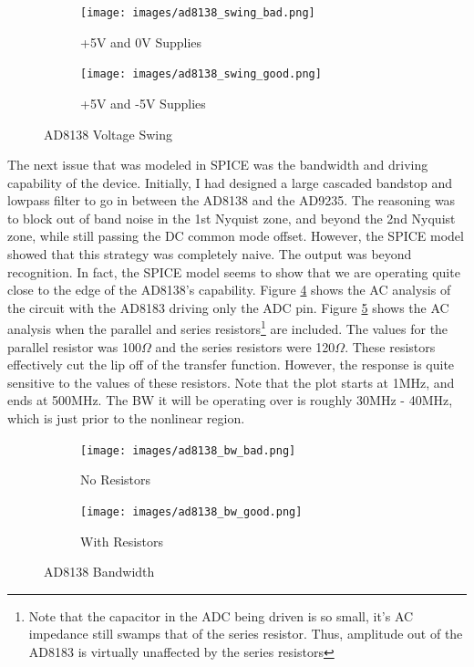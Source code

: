 \documentclass[a4paper, 12pt, notitlepage]{article}
\begin{document}
\begin{figure}[ht]
\centering
\begin{subfigure}[b]{0.45\textwidth}
  \texttt{[image: images/ad8138\_swing\_bad.png]}
  \caption{+5V and 0V Supplies}
  \label{fig:ad8138_swing_bad}
\end{subfigure}
\begin{subfigure}[b]{0.45\textwidth}  
  \texttt{[image: images/ad8138\_swing\_good.png]}
  \caption{+5V and -5V Supplies}
  \label{fig:ad8138_swing_good}
\end{subfigure}

\caption{AD8138 Voltage Swing}
\label{fig:ad8138_swing}
\end{figure}

The next issue that was modeled in SPICE was the bandwidth and driving capability of the device.  Initially, I had designed a large cascaded bandstop and lowpass filter to go in between the AD8138 and the AD9235.  The reasoning was to block out of band noise in the 1st Nyquist zone, and beyond the 2nd Nyquist zone, while still passing the DC common mode offset.  However, the SPICE model showed that this strategy was completely naive.  The output was beyond recognition.  In fact, the SPICE model seems to show that we are operating quite close to the edge of the AD8138's capability.  Figure \ref{fig:ad8138_bw_bad} shows the AC analysis of the circuit with the AD8183 driving only the ADC pin.  Figure \ref{fig:ad8138_bw_good} shows the AC analysis when the parallel and series resistors\footnote{Note that the capacitor in the ADC being driven is so small, it's AC impedance still swamps that of the series resistor.  Thus, amplitude out of the AD8183 is virtually unaffected by the series resistors} are included.  The values for the parallel resistor was 100$\Omega$ and the series resistors were 120$\Omega$.  These resistors effectively cut the lip off of the transfer function.  However, the response is quite sensitive to the values of these resistors.  Note that the plot starts at 1MHz, and ends at 500MHz.  The BW it will be operating over is roughly 30MHz - 40MHz, which is just prior to the nonlinear region.

\begin{figure}[ht]
\centering
\begin{subfigure}[b]{0.45\textwidth}
  \texttt{[image: images/ad8138\_bw\_bad.png]}
  \caption{No Resistors}
  \label{fig:ad8138_bw_bad}
\end{subfigure}
\begin{subfigure}[b]{0.45\textwidth}  
  \texttt{[image: images/ad8138\_bw\_good.png]}
  \caption{With Resistors}
  \label{fig:ad8138_bw_good}
\end{subfigure}

\caption{AD8138 Bandwidth}
\label{fig:ad8138_bw}
\end{figure}
\end{document}
